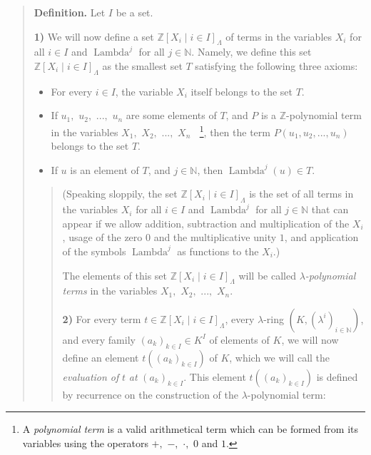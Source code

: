 \documentclass[12pt,final,notitlepage,onecolumn,german]{article}%
\begin{document}
\begin{quote}
\textbf{Definition.} Let $I$ be a set.

\textbf{1)} We will now define a set $\mathbb{Z}\left[  X_{i}\mid i\in
I\right]  _{\Lambda}$ of terms in the variables $X_{i}$ for all $i\in I$ and
$\operatorname*{Lambda}^{j}$ for all $j\in\mathbb{N}$. Namely, we define this
set $\mathbb{Z}\left[  X_{i}\mid i\in I\right]  _{\Lambda}$ as the smallest
set $T$ satisfying the following three axioms:

\begin{itemize}
\item For every $i\in I$, the variable $X_{i}$ itself belongs to the set $T$.

\item If $u_{1},$ $u_{2},$ $...,$ $u_{n}$ are some elements of $T$, and $P$ is
a $\mathbb{Z}$-polynomial term in the variables $X_{1},$ $X_{2},$ $...,$
$X_{n}\ \ \ \ $\footnote{A \textit{polynomial term} is a valid arithmetical
term which can be formed from its variables using the operators $+,$ $-,$
$\cdot,$ $0$ and $1$.}, then the term $P\left(  u_{1},u_{2},...,u_{n}\right)
$ belongs to the set $T$.

\item If $u$ is an element of $T$, and $j\in\mathbb{N}$, then
$\operatorname*{Lambda}^{j}\left(  u\right)  \in T$.
\end{itemize}

\begin{quote}
(Speaking sloppily, the set $\mathbb{Z}\left[  X_{i}\mid i\in I\right]
_{\Lambda}$ is the set of all terms in the variables $X_{i}$ for all $i\in I$
and $\operatorname*{Lambda}^{j}$ for all $j\in\mathbb{N}$ that can appear if
we allow addition, subtraction and multiplication of the $X_{i}$, usage of the
zero $0$ and the multiplicative unity $1$, and application of the symbols
$\operatorname*{Lambda}^{j}$ as functions to the $X_{i}$.)

The elements of this set $\mathbb{Z}\left[  X_{i}\mid i\in I\right]
_{\Lambda}$ will be called $\lambda$\textit{-polynomial terms} in the
variables $X_{1},$ $X_{2},$ $...,$ $X_{n}$.

\textbf{2)} For every term $t\in\mathbb{Z}\left[  X_{i}\mid i\in I\right]
_{\Lambda}$, every $\lambda$-ring $\left(  K,\left(  \lambda^{i}\right)
_{i\in\mathbb{N}}\right)  $, and every family $\left(  a_{k}\right)  _{k\in
I}\in K^{I}$ of elements of $K$, we will now define an element $t\left(
\left(  a_{k}\right)  _{k\in I}\right)  $ of $K$, which we will call the
\textit{evaluation of }$t$ \textit{at }$\left(  a_{k}\right)  _{k\in I}$. This
element $t\left(  \left(  a_{k}\right)  _{k\in I}\right)  $ is defined by
recurrence on the construction of the $\lambda$-polynomial term:


\end{quote}
\end{quote}
\end{document}
